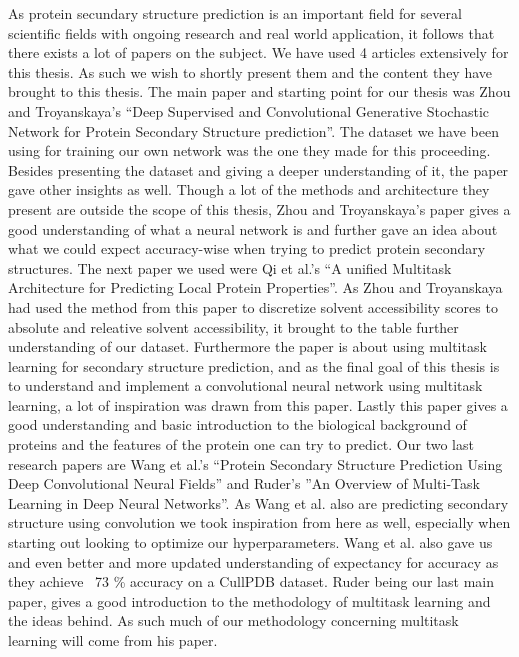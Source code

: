 As protein secundary structure prediction is an important field for several scientific fields with ongoing research and real world application, it follows that there exists a lot of papers on the subject. We have used 4 articles extensively for this thesis. As such we wish to shortly present them and the content they have brought to this thesis. 
The main paper and starting point for our thesis was Zhou and Troyanskaya’s “Deep Supervised and Convolutional Generative Stochastic Network for Protein Secondary Structure prediction”. The dataset we have been using for training our own network was the one they made for this proceeding. Besides presenting the dataset and giving a deeper understanding of it, the paper gave other insights as well. Though a lot of the methods and architecture they present are outside the scope of this thesis, Zhou and Troyanskaya’s paper gives a good understanding of what a neural network is and further gave an idea about what we could expect accuracy-wise when trying to predict protein secondary structures. 
The next paper we used were Qi et al.’s “A unified Multitask Architecture for Predicting Local Protein Properties”. As Zhou and Troyanskaya had used the method from this paper to discretize solvent accessibility scores to absolute and releative solvent accessibility, it brought to the table further understanding of our dataset. Furthermore the paper is about using multitask learning for secondary structure prediction, and as the final goal of this thesis is to understand and implement a convolutional neural network using multitask learning, a lot of inspiration was drawn from this paper. Lastly this paper gives a good understanding and basic introduction to the biological background of proteins and the features of the protein one can try to predict. 
Our two last research papers are Wang et al.’s “Protein Secondary Structure Prediction Using Deep Convolutional Neural Fields” and Ruder’s ”An Overview of Multi-Task Learning in Deep Neural Networks”.  As Wang et al. also are predicting secondary structure using convolution we took inspiration from here as well, especially when starting out looking to optimize our hyperparameters. Wang et al. also gave us and even better and more updated understanding of expectancy for accuracy as they achieve ~73 \% accuracy on a CullPDB dataset. Ruder being our last main paper, gives a good introduction to the methodology of multitask learning and the ideas behind. As such much of our methodology concerning multitask learning will come from his paper.











